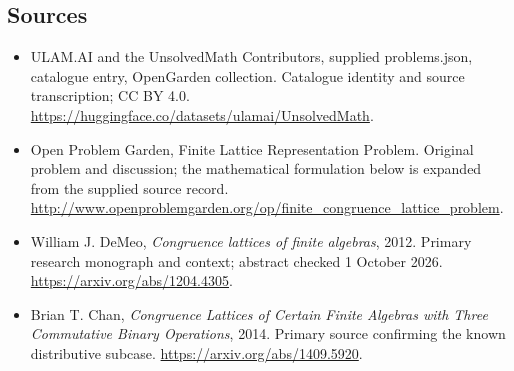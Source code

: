 \documentclass[11pt,a4paper]{article}
\begin{document}
\subsection{Sources}
\begin{itemize}
\item[S1] ULAM.AI and the UnsolvedMath Contributors, supplied problems.json, catalogue entry, OpenGarden collection. Catalogue identity and source transcription; CC BY 4.0.
\url{https://huggingface.co/datasets/ulamai/UnsolvedMath}.
\item[S2] Open Problem Garden, Finite Lattice Representation Problem. Original problem and discussion; the mathematical formulation below is expanded from the supplied source record.
\url{http://www.openproblemgarden.org/op/finite_congruence_lattice_problem}.

\item[R1] William J. DeMeo, \emph{Congruence lattices of finite algebras},
2012. Primary research monograph and context; abstract checked 1 October 2026.
\url{https://arxiv.org/abs/1204.4305}.
\item[R2] Brian T. Chan, \emph{Congruence Lattices of Certain Finite
Algebras with Three Commutative Binary Operations}, 2014. Primary
source confirming the known distributive subcase.
\url{https://arxiv.org/abs/1409.5920}.

\end{itemize}
\end{document}
